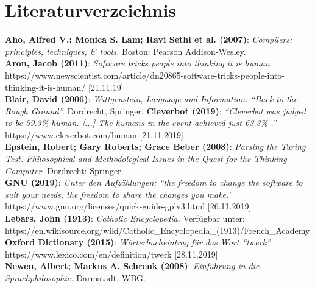 \documentclass[10pt,a4paper]{article}
\begin{document}
\section*{Literaturverzeichnis}
\label{Literaturverzeichnis}
\textbf{Aho, Alfred V.; Monica S. Lam; Ravi Sethi et al. (2007)}: \textit{Compilers: \\ principles, techniques, \& tools.} Boston: Pearson Addison-Wesley. \\
\textbf{Aron, Jacob (2011)}: \textit{Software tricks people into thinking it is human} \\ https://www.newscientist.com/article/dn20865-software-tricks-people-into-thinking-it-is-human/ [21.11.19] \\
\textbf{Blair, David (2006)}: \textit{Wittgenstein, Language and Information: \enquote{Back to the Rough Ground}.} Dordrecht, Springer.
\textbf{Cleverbot (2019)}: \textit{\enquote{Cleverbot was judged to be 59.3\% human. [...] The humans in the event achieved just 63.3\% .}} https://www.cleverbot.com/human [21.11.2019] \\
\textbf{Epstein, Robert; Gary Roberts; Grace Beber (2008)}: \textit{Parsing the Turing Test. Philosophical and Methodological Issues in the Quest for the Thinking Computer.} Dordrecht: Springer. \\
\textbf{GNU (2019)}: \textit{Unter den Aufzählungen: \enquote{the freedom to change the software to suit your needs, the freedom to share the changes you make.}} \\
https://www.gnu.org/licenses/quick-guide-gplv3.html [26.11.2019] \\
\textbf{Lebars, John (1913)}: \textit{Catholic Encyclopedia.} Verfügbar unter: \\ https://en.wikisource.org/wiki/Catholic\_Encyclopedia\_(1913)/French\_Academy \\
\textbf{Oxford Dictionary (2015)}: \textit{Wörterbucheintrag für das Wort \enquote{twerk}} \\ https://www.lexico.com/en/definition/twerk [28.11.2019] \\
\textbf{Newen, Albert; Markus A. Schrenk (2008)}: \textit{Einführung in die Sprachphilosophie.} Darmstadt: WBG. \\
\end{document}
